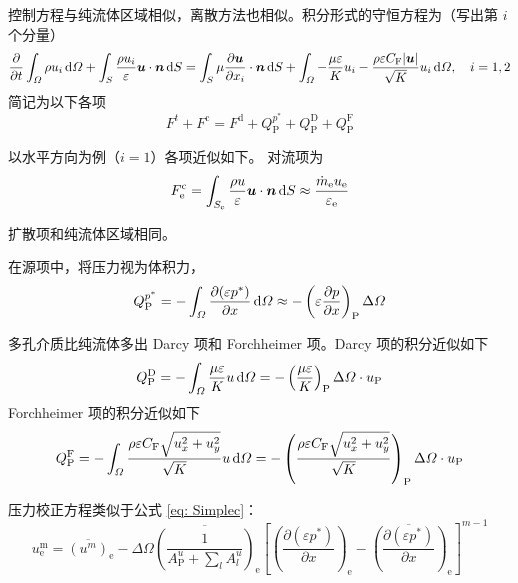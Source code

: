控制方程与纯流体区域相似，离散方法也相似。积分形式的守恒方程为（写出第 $i$ 个分量）
\begin{equation}\label{eq: porous conservation}
	\frac{\partial}{\partial t}\int_{\varOmega}\rho u_i\,\mathrm{d}\varOmega +
	\int_S\frac{\rho u_i}{\varepsilon}\bm{u}\cdot\bm{n}\,\mathrm{d} S =
	\int_S\mu\frac{\partial\bm{u}}{\partial x_i}\cdot\bm{n}\,\mathrm{d} S +
	\int_{\varOmega} - \frac{\mu\varepsilon}{K}u_i - 
	\frac{\rho\varepsilon C_{\mathrm{F}}\lvert\bm{u}\vert}{\sqrt K}u_i \,\mathrm{d}\varOmega, \quad i=1,2
\end{equation}
简记为以下各项
\begin{equation}
	F^t + F^{\mathrm{c}} = F^{\mathrm{d}} + Q_{\mathrm{P}}^{p^*} + Q_{\mathrm{P}}^{\mathrm{D}} + Q_{\mathrm{P}}^{\mathrm{F}}
\end{equation}

以水平方向为例（$i=1$）各项近似如下。
对流项为
\begin{equation}
	F_{\mathrm{e}}^{\mathrm{c}} = 
	\int_{S_{\mathrm{e}}}\frac{\rho u}{\varepsilon}\bm{u}\cdot\bm{n}\,\mathrm{d} S \approx \frac{\dot m_{\mathrm{e}} u_{\mathrm{e}}}{\varepsilon_{\mathrm{e}}}
\end{equation}

扩散项和纯流体区域相同。

在源项中，将压力视为体积力，
\begin{equation}
	Q_{\mathrm{P}}^{p^*} = 
	-\int_{\varOmega} \frac{\partial(\varepsilon p^*)}{\partial x} \,\mathrm{d}\varOmega \approx 
	-\left(\varepsilon \frac{\partial p}{\partial x}\right)_{\mathrm{P}} \Delta\varOmega
\end{equation}

多孔介质比纯流体多出 Darcy 项和 Forchheimer 项。Darcy 项的积分近似如下
\begin{equation}
	Q_{\mathrm{P}}^{\mathrm{D}} = 
	-\int_{\varOmega} \frac{\mu\varepsilon}{K}u \,\mathrm{d}\varOmega = 
	-\left(\frac{\mu\varepsilon}{K}\right)_{\mathrm{P}} \Delta\varOmega\cdot u_{\mathrm{P}}
\end{equation}
Forchheimer 项的积分近似如下
\begin{equation}
	Q_{\mathrm{P}}^{\mathrm{F}} = -\int_{\varOmega} \frac{\rho\varepsilon C_{\mathrm{F}}\sqrt{u_x^2+u_y^2}}{\sqrt K} u\,\mathrm{d}\varOmega = -\left(\frac{\rho\varepsilon C_{\mathrm{F}}\sqrt{u_x^2+u_y^2}}{\sqrt K}\right)_{\mathrm{P}} \Delta\varOmega\cdot u_{\mathrm{P}}
\end{equation}

压力校正方程类似于公式 \eqref{eq: Simplec}：
\begin{equation}
	u_{\mathrm{e}}^{\mathrm{m}} = \overline{(u^m)}_{\mathrm{e}} - \Delta\varOmega \overline{\left(\frac{1}{A_{\mathrm{P}}^u+\sum_lA_l^u}\right)}_{\mathrm{e}} \left[\left(\frac{\partial(\varepsilon p^*)}{\partial x}\right)_{\mathrm{e}}-\overline{\left(\frac{\partial(\varepsilon p^*)}{\partial x}\right)}_{\mathrm{e}}\right]^{m-1}
\end{equation}

